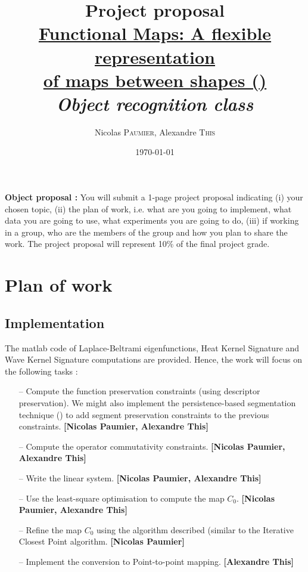 \documentclass{article}
\title{Project proposal \\ \underline{Functional Maps: A flexible representation }\\ \underline{of maps between shapes (\cite{ovsjanikov2012functional})}\\ \textit{Object recognition class}} %
\author{Nicolas \textsc{Paumier}, Alexandre \textsc{This}} %
\date{\today} %
\begin{document}
\maketitle %



\setlength\parindent{0pt} %

\renewcommand{\labelenumi}{\alph{enumi}.} %

\vspace{3cm}
\textbf{Object proposal : } You will submit a 1-page project proposal indicating (i) your chosen topic, (ii) the plan of work, i.e. what are you going to implement, what data you are going to use, what experiments you are going to do, (iii) if working in a group, who are the members of the group and how you plan to share the work. The project proposal will represent 10\% of the final project grade.

\tableofcontents

\newpage

\section{Plan of work}
\subsection{Implementation}
The matlab code of Laplace-Beltrami eigenfunctions, Heat Kernel Signature and Wave Kernel Signature computations are provided. Hence, the work will focus on the following tasks :

\begin{itemize}
\item[--]{Compute the function preservation constraints (using descriptor preservation). We might also implement the persistence-based segmentation technique (\cite{}) to add segment preservation constraints to the previous constraints. \textbf{[Nicolas Paumier, Alexandre This]}}
\item[--]{Compute the operator commutativity constraints. \textbf{[Nicolas Paumier, Alexandre This]}}
\item[--]{Write the linear system. \textbf{[Nicolas Paumier, Alexandre This]}}
\item[--]{Use the least-square optimisation to compute the map $C_{0}$. \textbf{[Nicolas Paumier, Alexandre This]}}
\item[--]{Refine the map $C_{0}$ using the algorithm described (similar to the Iterative Closest Point algorithm. \textbf{[Nicolas Paumier]}}
\item[--]{Implement the conversion to Point-to-point mapping. \textbf{[Alexandre This]}}
\end{itemize}
\end{document}
